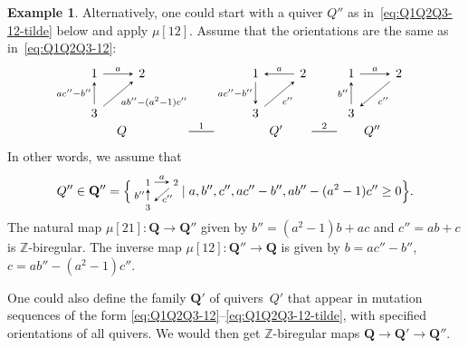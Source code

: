 \documentclass[11pt, letterpaper]{amsart}
\theoremstyle{definition}
\newtheorem{example}[theorem]{Example}
\numberwithin{equation}{section}
\def\ZZ{{\mathbb Z}}
\newcommand{\T}[2]{\mu[#1](#2)} %
\newcommand{\mutation}[1]{\stackrel{#1}{\rule[.5ex]{2em}{0.5pt}}}
\begin{document}
\begin{example}
Alternatively, one could start with a quiver $Q''$ as in~\eqref{eq:Q1Q2Q3-12-tilde} below and apply $\mu[12]$. 
Assume that the orientations are the same as in~\eqref{eq:Q1Q2Q3-12}: 
\begin{equation}
\label{eq:Q1Q2Q3-12-tilde}
\!\!\!\!\begin{array}{ccccccc}
\begin{tikzcd}[arrows={-stealth}]
  1 \arrow[r, "a"]  
  & 2 
  \\
  3 \arrow[u,"a {c''} - {b''}"] \arrow[ur, swap, "a{b''} - ( a^2 - 1){c''}" ] &
\end{tikzcd}
& &
\begin{tikzcd}[arrows={-stealth}]
  1    \arrow[d, swap, "a {c''} - {b''}"] 
  & 2 \arrow[l, swap, "a" ]  
  \\
   3 \arrow[ur, swap, "{c''}"] &
\end{tikzcd}
& &
\!\begin{tikzcd}[arrows={-stealth}]
  1    \arrow[r, "a"]
  & 2  \arrow[dl, "{c''}" ] 
  \\
   3 \arrow[u, "{b''}"] &
\end{tikzcd}
\\
Q
& \!\!\!\!\!\!\!\mutation{1}\!\!\!\!\!\!
& \qquad Q'
& \!\!\!\!\!\!\mutation{2}\!\!\!\!\!\!
& Q''
\end{array}
\end{equation}
In other words, we assume that 
\begin{equation*}
Q''\in \mathbf{Q''} = \Bigl\{ \begin{tikzcd}[arrows={-stealth}, sep=small, cramped]
  \scriptstyle 1    \arrow[r, "a"]
  & \scriptstyle 2  \arrow[dl, "{c''}" , outer sep=-2] 
  \\
   \scriptstyle 3 \arrow[u, "{b''}"] &
\end{tikzcd} \mid a,{b''},{c''}, a{c''}-{b''}, a{b''} -(a^2-1){c''} \ge 0
\Bigr\} . 
\end{equation*}
The natural map $\mu[21]:\mathbf{Q}\to \mathbf{Q''}$ given by
${b''} = (a^2\!-1)b+ac$ and ${c''} = ab+c$
is $\ZZ$-biregular. 
The inverse map %
$\mu[12]:\mathbf{Q''}\to \mathbf{Q}$
is given by 
$b=a{c''}-{b''}$,  $c=a{b''} - ( a^2 - 1){c''}$. 

One could also define the family $\mathbf{Q'}$ of quivers~$Q'$ that appear in mutation sequences
of the form \eqref{eq:Q1Q2Q3-12}--\eqref{eq:Q1Q2Q3-12-tilde}, with specified orientations of all quivers. 
We would then get $\ZZ$-biregular maps $\mathbf{Q}\to \mathbf{Q'}\to \mathbf{Q''}$. 
\end{example}
\end{document}
